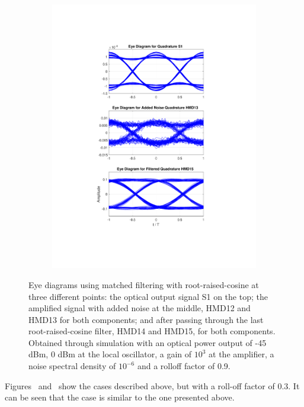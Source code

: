\begin{figure}[H]
\begin{subfigure}{.45\textwidth}
		\includegraphics[clip, trim=5cm 4cm 5cm 4cm, width=\textwidth]{./sdf/m_qam_system/figures/eyes/q_p_45_09.pdf}
	\end{subfigure}
	
	\caption{Eye diagrams using matched filtering with root-raised-cosine
		at three different points: the optical output signal S1 on the top; the
		amplified signal with added noise at the middle, HMD12 and HMD13 for both
		components; and after passing through the last root-raised-cosine filter, HMD14
		and HMD15, for both components. Obtained through simulation with an optical
		power output of -45 dBm, 0 dBm at the local oscillator, a gain of $10^3$ at the
		amplifier, a noise spectral density of $10^{-6}$ and a rolloff factor of
		0.9.\label{fig:eyes_n_rrc_45_09}}
\end{figure}


Figures~\label{fig:eyes_n_rc_45_03} and~\label{fig:eyes_n_rrc_45_03} show the
cases described above, but with a roll-off factor of 0.3. It can be seen that
the case is similar to the one presented above.


